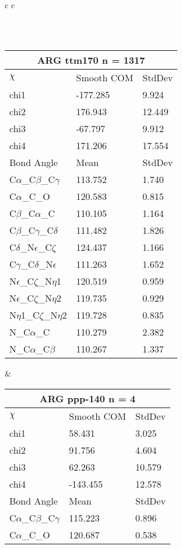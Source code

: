 \begin{longtable}{ c c }
\begin{tabular}{ l l l }
  \bottomrule
  \end{tabular}
  \\
  \begin{tabular}{ l l l }
  \toprule
  \multicolumn{3}{c}{ARG \textbf{ttm170} n = 1317} \\ \toprule
  $\chi$       & Smooth COM & StdDev \\ \midrule
  chi1 & -177.285 & 9.924 \\ 
  chi2 & 176.943 & 12.449 \\ 
  chi3 & -67.797 & 9.912 \\ 
  chi4 & 171.206 & 17.554 \\ \midrule
  Bond Angle   & Mean     & StdDev \\ \midrule
  C$\alpha$\_C$\beta$\_C$\gamma$ & 113.752 & 1.740\\
  C$\alpha$\_C\_O & 120.583 & 0.815\\
  C$\beta$\_C$\alpha$\_C & 110.105 & 1.164\\
  C$\beta$\_C$\gamma$\_C$\delta$ & 111.482 & 1.826\\
  C$\delta$\_N$\epsilon$\_C$\zeta$ & 124.437 & 1.166\\
  C$\gamma$\_C$\delta$\_N$\epsilon$ & 111.263 & 1.652\\
  N$\epsilon$\_C$\zeta$\_N$\eta$1 & 120.519 & 0.959\\
  N$\epsilon$\_C$\zeta$\_N$\eta$2 & 119.735 & 0.929\\
  N$\eta$1\_C$\zeta$\_N$\eta$2 & 119.728 & 0.835\\
  N\_C$\alpha$\_C & 110.279 & 2.382\\
  N\_C$\alpha$\_C$\beta$ & 110.267 & 1.337\\
  \bottomrule
  \end{tabular}
  &
  \begin{tabular}{ l l l }
  \toprule
  \multicolumn{3}{c}{ARG \textbf{ppp-140} n = 4} \\ \toprule
  $\chi$       & Smooth COM & StdDev \\ \midrule
  chi1 & 58.431 & 3.025 \\ 
  chi2 & 91.756 & 4.604 \\ 
  chi3 & 62.263 & 10.579 \\ 
  chi4 & -143.455 & 12.578 \\ \midrule
  Bond Angle   & Mean     & StdDev \\ \midrule
  C$\alpha$\_C$\beta$\_C$\gamma$ & 115.223 & 0.896\\
  C$\alpha$\_C\_O & 120.687 & 0.538\\

\end{tabular}
\end{longtable}

